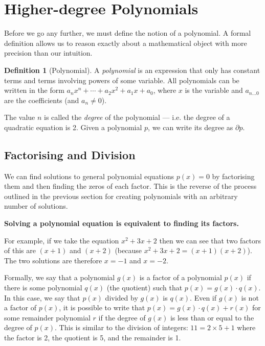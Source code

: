 \documentclass[a4paper,10pt,titlepage]{article}
\theoremstyle{definition}
\newtheorem*{defn}{Definition}
\begin{document}
\section{Higher-degree Polynomials}
Before we go any further, we must define the notion of a polynomial. A formal definition
allows us to reason exactly about a mathematical object with more precision than our
intuition.

\begin{defn}[Polynomial]
  A \emph{polynomial} is an expression that only has constant terms and terms involving
  powers of some variable. All polynomials can be written in the form
  $ a_n x^n + \cdots + a_2 x^2 + a_1 x + a_0 $, where $ x $ is the variable and
  $ a_{n...0} $ are the coefficients (and $ a_n \neq 0 $).

  The value $ n $ is called the \emph{degree} of the polynomial --- i.e. the degree of a
  quadratic equation is 2. Given a polynomial $ p $, we can write its degree as $ \partial p $.
\end{defn}

\subsection*{Factorising and Division}
We can find solutions to general polynomial equations $ p(x) = 0 $ by factorising
them and then finding the zeros of each factor. This is the reverse of the process
outlined in the previous section for creating polynomials with an arbitrary number of solutions.

\textbf{Solving a polynomial equation is equivalent to finding its factors.}

For example, if we take the equation $ x^2 + 3x + 2 $ then we can see that two factors of this are $ (x+1) $ and
$ (x+2) $ (because $ x^2 + 3x + 2 = (x+1)(x+2) $). The two solutions are therefore $ x = -1 $
and $ x = -2 $.

Formally, we say that a polynomial $ g(x) $ is a factor of a polynomial $ p(x) $ if there is some polynomial
$ q(x) $ (the quotient) such that $ p(x) = g(x) \cdot q(x) $. In this case, we say that $ p(x) $
divided by $ g(x) $ is $ q(x) $. Even if $ g(x) $ is not a factor of $ p(x) $, it is possible to
write that $ p(x) = g(x) \cdot q(x) + r(x) $ for some remainder polynomial $ r $ if the degree of
$ g(x) $ is less than or equal to the degree of $ p(x) $. This is similar to the division of
integers: $ 11 = 2 \times 5 + 1 $ where the factor is 2, the quotient is 5, and the remainder is 1.
\end{document}
